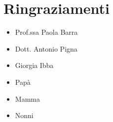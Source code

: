 \chapter{Ringraziamenti}
\begin{itemize}
    \item Prof.ssa Paola Barra
    \item Dott. Antonio Pigna
    \item Giorgia Ibba
    \item Papà
    \item Mamma
    \item Nonni
\end{itemize}
